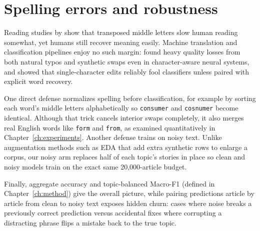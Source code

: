 \section{Spelling errors and robustness}
Reading studies by \citet{rayner2006} show that transposed middle letters slow human reading somewhat, yet humans still recover meaning easily. Machine translation and classification pipelines enjoy no such margin: \citet{belinkov2018} found heavy quality losses from both natural typos and synthetic swaps even in character-aware neural systems, and \citet{pruthi2019} showed that single-character edits reliably fool classifiers unless paired with explicit word recovery.

One direct defense normalizes spelling before classification, for example by sorting each word's middle letters alphabetically so \texttt{consumer} and \texttt{cosnumer} become identical. Although that trick cancels interior swaps completely, it also merges real English words like \texttt{form} and \texttt{from}, as examined quantitatively in Chapter~\ref{ch:experiments}. Another defense trains on noisy text. Unlike augmentation methods such as EDA \citep{wei2019} that add extra synthetic rows to enlarge a corpus, our noisy arm replaces half of each topic's stories in place so clean and noisy models train on the exact same 20,000-article budget.

Finally, aggregate accuracy and topic-balanced Macro-F1 (defined in Chapter~\ref{ch:method}) give the overall picture, while pairing predictions article by article from clean to noisy text exposes hidden churn: cases where noise breaks a previously correct prediction versus accidental fixes where corrupting a distracting phrase flips a mistake back to the true topic.

